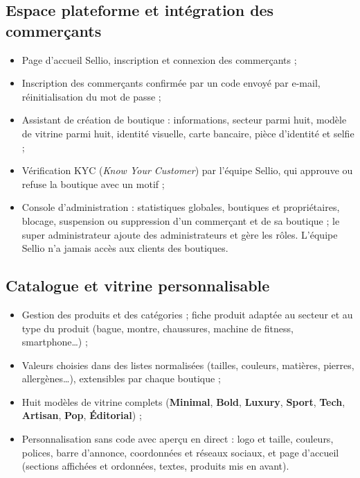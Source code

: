 \subsection{Espace plateforme et intégration des commerçants}
\begin{itemize}
    \item Page d'accueil Sellio, inscription et connexion des commerçants ;
    \item Inscription des commerçants confirmée par un code envoyé par e-mail, réinitialisation du mot de passe ;
    \item Assistant de création de boutique : informations, secteur parmi huit, modèle de vitrine parmi huit, identité visuelle, carte bancaire, pièce d'identité et selfie ;
    \item Vérification KYC (\textit{Know Your Customer}) par l'équipe Sellio, qui approuve ou refuse la boutique avec un motif ;
    \item Console d'administration : statistiques globales, boutiques et propriétaires, blocage, suspension ou suppression d'un commerçant et de sa boutique ; le super administrateur ajoute des administrateurs et gère les rôles. L'équipe Sellio n'a jamais accès aux clients des boutiques.
\end{itemize}

\subsection{Catalogue et vitrine personnalisable}
\begin{itemize}
    \item Gestion des produits et des catégories ; fiche produit adaptée au secteur et au type du produit (bague, montre, chaussures, machine de fitness, smartphone\dots) ;
    \item Valeurs choisies dans des listes normalisées (tailles, couleurs, matières, pierres, allergènes\dots), extensibles par chaque boutique ;
    \item Huit modèles de vitrine complets (\textbf{Minimal}, \textbf{Bold}, \textbf{Luxury}, \textbf{Sport}, \textbf{Tech}, \textbf{Artisan}, \textbf{Pop}, \textbf{Éditorial}) ;
    \item Personnalisation sans code avec aperçu en direct : logo et taille, couleurs, polices, barre d'annonce, coordonnées et réseaux sociaux, et page d'accueil (sections affichées et ordonnées, textes, produits mis en avant).
\end{itemize}

